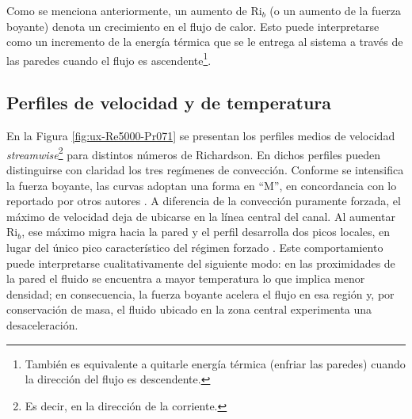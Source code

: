 Como se menciona anteriormente, un aumento de Ri$_b$ (o un aumento de la fuerza boyante) denota un crecimiento en el flujo de calor. Esto puede interpretarse como un incremento de la energía térmica que se le entrega al sistema a través de las paredes cuando el flujo es ascendente\footnote{También es equivalente a quitarle energía térmica (enfriar las paredes) cuando la dirección del flujo es descendente.}.

\subsection{Perfiles de velocidad y de temperatura} \label{sec:velo_temp}

En la Figura \ref{fig:ux-Re5000-Pr071} se presentan los perfiles medios de velocidad  \textit{streamwise}\footnote{Es decir, en la dirección de la corriente.} para distintos números de Richardson. En dichos perfiles pueden distinguirse con claridad los tres regímenes de convección. Conforme se intensifica la fuerza boyante, las curvas adoptan una forma en ``M'', en concordancia con lo reportado por otros autores \cite{you2003direct, zhou2024direct}. A diferencia de la convección puramente forzada, el máximo de velocidad deja de ubicarse en la línea central del canal. Al aumentar $\mathrm{Ri}_b$, ese máximo migra hacia la pared y el perfil desarrolla dos picos locales, en lugar del único pico característico del régimen forzado \cite{carr1973velocity,steiner1971reverse,zhou2024direct}. Este comportamiento puede interpretarse cualitativamente del siguiente modo: en las proximidades de la pared el fluido se encuentra a mayor temperatura lo que implica menor densidad; en consecuencia, la fuerza boyante acelera el flujo en esa región y, por conservación de masa, el fluido ubicado en la zona central experimenta una desaceleración.

